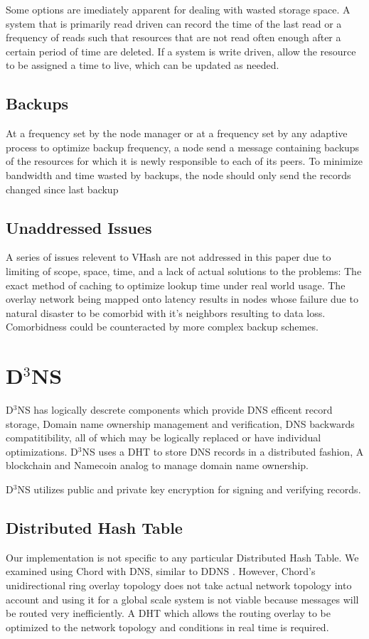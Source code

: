 \documentclass[11pt]{IEEEtran} %
\begin{document}
Some options are imediately apparent for dealing with wasted storage space. A system that is primarily read driven can record the time of the last read or a frequency of reads such that resources that are not read often enough after a certain period of time are deleted. If a system is write driven, allow the resource to be assigned a time to live, which can be updated as needed.

\subsection{Backups}
At a frequency set by the node manager or at a frequency set by any adaptive process to optimize backup frequency, a node send a message containing backups of the resources for which it is newly responsible to each of its peers. To minimize bandwidth and time wasted by backups, the node should only send the records changed since last backup

\subsection{Unaddressed Issues}
A series of issues relevent to VHash are not addressed in this paper due to limiting of scope, space, time, and a lack of actual solutions to the problems: The exact method of caching to optimize lookup time under real world usage. The overlay network being mapped onto latency results in nodes whose failure due to natural disaster to be comorbid with it's neighbors resulting to data loss. Comorbidness could be counteracted by more complex backup schemes.

\section{D$^{3}$NS}
D$^{3}$NS has logically descrete components which provide DNS efficent record storage, Domain name ownership management and verification, DNS backwards compatitibility, all of which may be logically replaced or have individual optimizations. D$^{3}$NS uses a DHT to store DNS records in a distributed fashion, A blockchain and Namecoin\cite{namecoin} analog to manage domain name ownership.

D$^{3}$NS utilizes public and private key encryption for signing and verifying records.


\subsection{Distributed Hash Table}
Our implementation is not specific to any particular Distributed Hash Table.  We examined using Chord \cite{chord} with DNS, similar to DDNS \cite{cox}.  However, Chord’s unidirectional ring overlay topology does not take actual network topology into account and using it for a global scale system is not viable because messages will be routed very inefficiently. A DHT which allows the routing overlay to be optimized to the network topology and conditions in real time is required.
\end{document}
